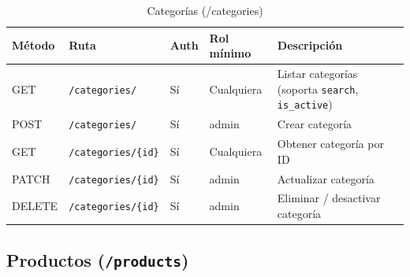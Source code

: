 \begin{longtable}[]{@{}
  >{\raggedright\arraybackslash}p{}
  >{\raggedright\arraybackslash}p{}
  >{\raggedright\arraybackslash}p{}
  >{\raggedright\arraybackslash}p{}
  >{\raggedright\arraybackslash}p{}@{}}
\caption[Categorías (/categories)]{Categorías (/categories)}\tabularnewline
\toprule\noalign{}
\begin{minipage}[b]{\linewidth}\raggedright
Método
\end{minipage} & \begin{minipage}[b]{\linewidth}\raggedright
Ruta
\end{minipage} & \begin{minipage}[b]{\linewidth}\raggedright
Auth
\end{minipage} & \begin{minipage}[b]{\linewidth}\raggedright
Rol mínimo
\end{minipage} & \begin{minipage}[b]{\linewidth}\raggedright
Descripción
\end{minipage} \\
\midrule\noalign{}
\endhead
\bottomrule\noalign{}
\endlastfoot
GET & \texttt{/categories/} & Sí & Cualquiera & Listar categorías (soporta \texttt{search}, \texttt{is\_active}) \\
POST & \texttt{/categories/} & Sí & admin & Crear categoría \\
GET & \texttt{/categories/\{id\}} & Sí & Cualquiera & Obtener categoría por ID \\
PATCH & \texttt{/categories/\{id\}} & Sí & admin & Actualizar categoría \\
DELETE & \texttt{/categories/\{id\}} & Sí & admin & Eliminar / desactivar categoría \\
\end{longtable}

\subsection{\texorpdfstring{Productos (\texttt{/products})}{Productos (/products)}}\label{productos-products}

